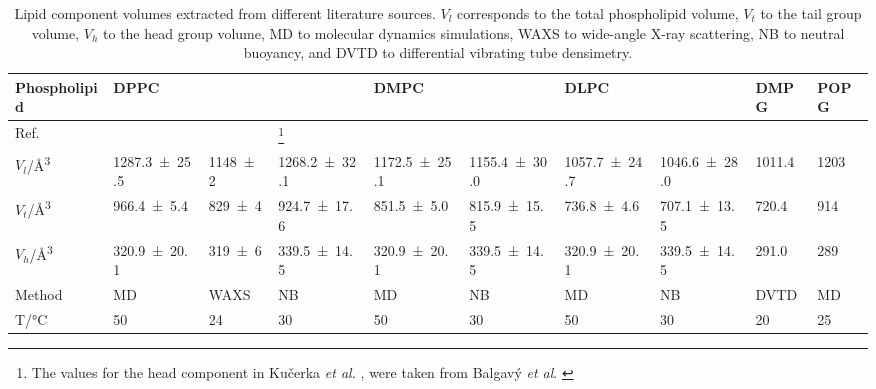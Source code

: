 \begin{sidewaystable}
    \centering
  \small
    \caption{Lipid component volumes extracted from different literature sources. $V_l$ corresponds to the total phospholipid volume, $V_t$ to the tail group volume, $V_h$ to the head group volume, MD to molecular dynamics simulations, WAXS to wide-angle X-ray scattering, NB to neutral buoyancy, and DVTD to differential vibrating tube densimetry.}
    \label{tab:water}
    \begin{tabular}{l | l l l | l l | l l | l | l}
        \toprule
        Phospholipid & \multicolumn{3}{l|}{DPPC} & \multicolumn{2}{|l|}{DMPC} & \multicolumn{2}{|l|}{DLPC} & DMPG & POPG \\
        \midrule
    Ref. & \cite{armen_phospholipid_1998} & \cite{sun_order_1994} & \cite{kucerka_determination_2004,balgavy_evaluation_2001}\footnote{The values for the head component in Ku\v{c}erka \emph{et al.} \cite{kucerka_determination_2004}, were taken from Balgav\'{y} \emph{et al}. \cite{balgavy_evaluation_2001}} & \cite{armen_phospholipid_1998} & \cite{kucerka_determination_2004,balgavy_evaluation_2001} & \cite{armen_phospholipid_1998} & \cite{kucerka_determination_2004,balgavy_evaluation_2001} & \cite{pan_molecular_2012} & \cite{kucerka_scattering_2012} \\
    \midrule
    $V_l$/\si{\angstrom\cubed} & \num{1287.3 \pm 25.5} & \num{1148 \pm 2} & \num{1268.2 \pm 32.1} & \num{1172.5 \pm 25.1} & \num{1155.4 \pm 30.0} & \num{1057.7 \pm 24.7} & \num{1046.6 \pm 28.0} & \num{1011.4} & \num{1203} \\
    $V_t$/\si{\angstrom\cubed} & \num{966.4 \pm 5.4} & \num{829 \pm 4} & \num{924.7 \pm 17.6} & \num{851.5 \pm 5.0} & \num{815.9 \pm 15.5} & \num{736.8 \pm 4.6} & \num{707.1 \pm 13.5} & \num{720.4} & \num{914} \\
    $V_h$/\si{\angstrom\cubed} & \num{320.9 \pm 20.1} & \num{319 \pm 6} & \num{339.5 \pm 14.5} & \num{320.9 \pm 20.1} & \num{339.5 \pm 14.5} & \num{320.9 \pm 20.1} & \num{339.5 \pm 14.5} & \num{291.0} & \num{289} \\
    \midrule
    Method & MD & WAXS & NB & MD & NB & MD & NB & DVTD & MD \\
    T/\si{\celsius}& 50 & 24 & 30 & 50 & 30 & 50 & 30 & 20 & 25 \\
        \bottomrule
    \end{tabular}
\end{sidewaystable}
%

